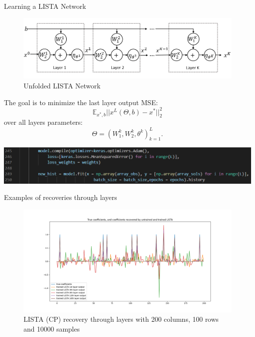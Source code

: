 \documentclass{beamer}
\begin{document}
\begin{frame}{Learning a LISTA Network}
    \begin{minipage}[t]{0.65\textwidth}
        \raggedleft
        \begin{figure}
            \raggedleft
            \includegraphics[width=\textwidth]{Unfolded_LISTA.png}
            \caption{Unfolded LISTA Network}
        \end{figure}
    \end{minipage}
    \begin{minipage}[t]{0.33\textwidth}
        The goal is to minimize the last layer output MSE:
        \begin{equation*}
            \mathbb{E}_{x^*,b}||x^L(\Theta, b) - x^*||_2^2
        \end{equation*}
      over all layers parameters: 
      \begin{equation*}
            \Theta=(W_1^k,W_2^k,\theta^k)_{k=1}^L.
        \end{equation*}
    \end{minipage}
    \centering
    \includegraphics[width=1.05\textwidth]{learning_default.png}
    
\end{frame}

\begin{frame}{Examples of recoveries through layers}
    \begin{figure}
         \centering
        \includegraphics[height=0.7\textheight]{recov_listaaaocp_s10000_c200_r100.png}
        \caption{LISTA (CP) recovery through layers with 200 columns, 100 rows and 10000 samples}
        \label{fig:my_label}
    \end{figure}

\end{frame}
\end{document}
